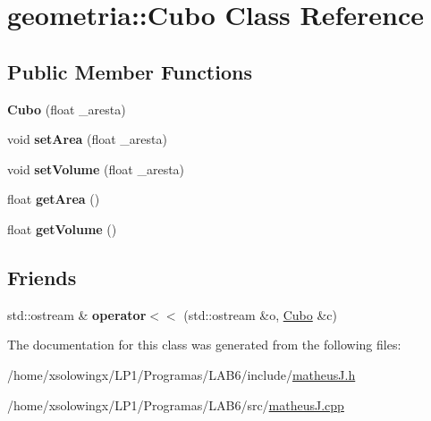 \hypertarget{classgeometria_1_1Cubo}{}\section{geometria\+:\+:Cubo Class Reference}
\label{classgeometria_1_1Cubo}
\subsection*{Public Member Functions}
\begin{DoxyCompactItemize}
\item 
\mbox{\label{classgeometria_1_1Cubo_a358d083992f317213fe9a208f4fe7661}} 
{\bfseries Cubo} (float \+\_\+aresta)
\item 
\mbox{\label{classgeometria_1_1Cubo_ae240e81d97c5a014bf2cce500fa7966c}} 
void {\bfseries set\+Area} (float \+\_\+aresta)
\item 
\mbox{\label{classgeometria_1_1Cubo_a3ae0d7fd2594ba27a21dd1b49e793e12}} 
void {\bfseries set\+Volume} (float \+\_\+aresta)
\item 
\mbox{\label{classgeometria_1_1Cubo_a37da1b2a6e597d098c56d33b4d66ef62}} 
float {\bfseries get\+Area} ()
\item 
\mbox{\label{classgeometria_1_1Cubo_a3c298f654b47ee1a5a26edb7af30bb71}} 
float {\bfseries get\+Volume} ()
\end{DoxyCompactItemize}
\subsection*{Friends}
\begin{DoxyCompactItemize}
\item 
\mbox{\label{classgeometria_1_1Cubo_ac82e09a9c5701e44ab30f463a9ea4deb}} 
std\+::ostream \& {\bfseries operator$<$$<$} (std\+::ostream \&o, \hyperlink{classgeometria_1_1Cubo}{Cubo} \&c)
\end{DoxyCompactItemize}


The documentation for this class was generated from the following files\+:\begin{DoxyCompactItemize}
\item 
/home/xsolowingx/\+L\+P1/\+Programas/\+L\+A\+B6/include/\hyperlink{matheusJ_8h}{matheus\+J.\+h}\item 
/home/xsolowingx/\+L\+P1/\+Programas/\+L\+A\+B6/src/\hyperlink{matheusJ_8cpp}{matheus\+J.\+cpp}\end{DoxyCompactItemize}
